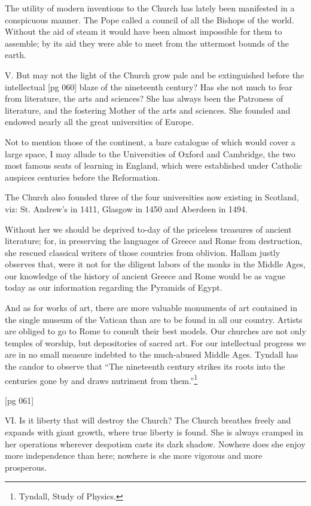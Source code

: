 The utility of modern inventions to the Church
has lately been manifested in a conspicuous manner.
The Pope called a council of all the Bishops
of the world. Without the aid of steam it would
have been almost impossible for them to assemble;
by its aid they were able to meet from the
uttermost bounds of the earth.

V. But may not the light of the Church grow
pale and be extinguished before the intellectual
[pg 060]
blaze of the nineteenth century? Has she not
much to fear from literature, the arts and
sciences? She has always been the Patroness
of literature, and the fostering Mother of the
arts and sciences. She founded and endowed
nearly all the great universities of Europe.

Not to mention those of the continent, a bare
catalogue of which would cover a large space, I
may allude to the Universities of Oxford and Cambridge,
the two most famous seats of learning in
England, which were established under Catholic
auspices centuries before the Reformation.

The Church also founded three of the four universities
now existing in Scotland, viz: St. Andrew's
in 1411, Glasgow in 1450 and Aberdeen in
1494.

Without her we should be deprived to-day of
the priceless treasures of ancient literature; for,
in preserving the languages of Greece and Rome
from destruction, she rescued classical writers of
those countries from oblivion. Hallam justly observes
that, were it not for the diligent labors
of the monks in the Middle Ages, our knowledge
of the history of ancient Greece and Rome would
be as vague today as our information regarding
the Pyramids of Egypt.

And as for works of art, there are more valuable
monuments of art contained in the single
museum of the Vatican than are to be found in
all our country. Artists are obliged to go to
Rome to consult their best models. Our churches
are not only temples of worship, but depositories
of sacred art. For our intellectual progress we
are in no small measure indebted to the much-abused
Middle Ages. Tyndall has the candor to
observe that “The nineteenth century strikes its
roots into the centuries gone by and draws nutriment
from them.”\footnote{Tyndall, Study of Physics.}

[pg 061]

VI. Is it liberty that will destroy the Church?
The Church breathes freely and expands with
giant growth, where true liberty is found. She is
always cramped in her operations wherever despotism
casts its dark shadow. Nowhere does she
enjoy more independence than here; nowhere is
she more vigorous and more prosperous.

